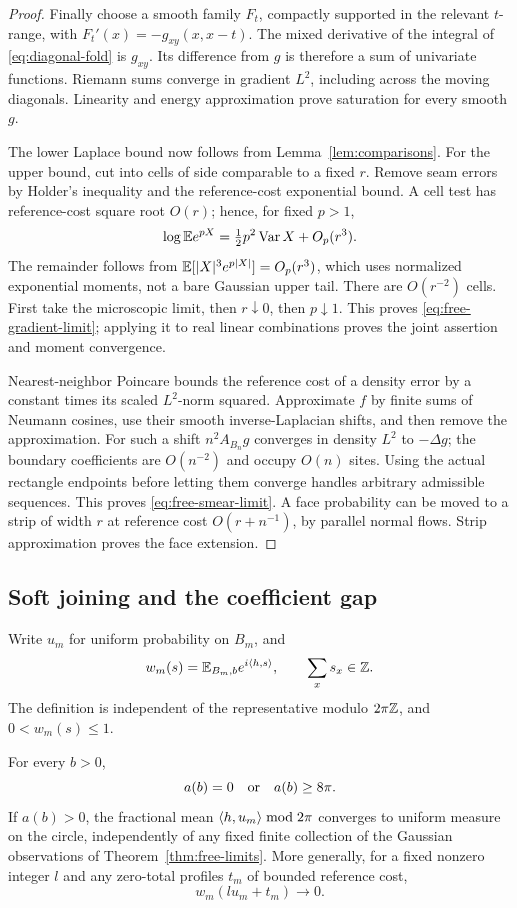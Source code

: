 \begin{proof}
Finally choose a smooth family \(F_t\), compactly supported in the
relevant \(t\)-range, with \(F_t'(x)=-g_{xy}(x,x-t)\).
The mixed derivative of the integral of
\eqref{eq:diagonal-fold} is \(g_{xy}\). Its difference from \(g\)
is therefore a sum of univariate functions. Riemann sums converge
in gradient \(L^2\), including across the moving diagonals.
Linearity and energy approximation prove saturation for every
smooth \(g\).

The lower Laplace bound now follows from
Lemma~\ref{lem:comparisons}. For the upper bound, cut into cells of
side comparable to a fixed \(r\). Remove seam errors by Holder's
inequality and the reference-cost exponential bound. A cell test
has reference-cost square root \(O(r)\); hence, for fixed \(p>1\),
\[
 \log\mathbb E e^{pX}
   =\tfrac12p^2\operatorname{Var} X+O_p(r^3).
\]
The remainder follows from
\(\mathbb E[|X|^3e^{p|X|}]=O_p(r^3)\), which uses normalized exponential
moments, not a bare Gaussian upper tail.
There are \(O(r^{-2})\) cells. First take the microscopic limit,
then \(r\downarrow0\), then \(p\downarrow1\).
This proves \eqref{eq:free-gradient-limit}; applying it to real
linear combinations proves the joint assertion and moment
convergence.

Nearest-neighbor Poincare bounds the reference cost of a density
error by a constant times its scaled \(L^2\)-norm squared.
Approximate \(f\) by finite sums of Neumann cosines, use their
smooth inverse-Laplacian shifts, and then remove the approximation.
For such a shift \(n^2A_{B_n}g\) converges in density \(L^2\) to
\(-\Delta g\); the boundary coefficients are \(O(n^{-2})\) and
occupy \(O(n)\) sites. Using the actual rectangle endpoints before
letting them converge handles arbitrary admissible sequences.
This proves \eqref{eq:free-smear-limit}.
A face probability can be moved to a strip of width \(r\) at
reference cost \(O(r+n^{-1})\), by parallel normal flows.
Strip approximation proves the face extension.
\end{proof}

\subsection{Soft joining and the coefficient gap}

Write \(u_m\) for uniform probability on \(B_m\), and
\[
 w_m(s)=\mathbb E_{B_m,b}e^{i\langle h,s\rangle},
 \qquad \sum_xs_x\in\mathbb Z.
\]
The definition is independent of the representative modulo
\(2\pi\mathbb Z\), and \(0<w_m(s)\le1\).

\begin{theorem}
\label{thm:coefficient-gap}
For every \(b>0\),
\[
 a(b)=0\quad\hbox{or}\quad a(b)\ge8\pi.
\]
If \(a(b)>0\), the fractional mean
\(\langle h,u_m\rangle\bmod2\pi\) converges to uniform measure on the circle,
independently of any fixed finite collection of the Gaussian
observations of Theorem~\ref{thm:free-limits}.
More generally, for a fixed nonzero integer \(l\) and any zero-total
profiles \(t_m\) of bounded reference cost,
\begin{equation}
 w_m(lu_m+t_m)\longrightarrow0.
 \label{eq:uniform-phase}
\end{equation}
\end{theorem}


